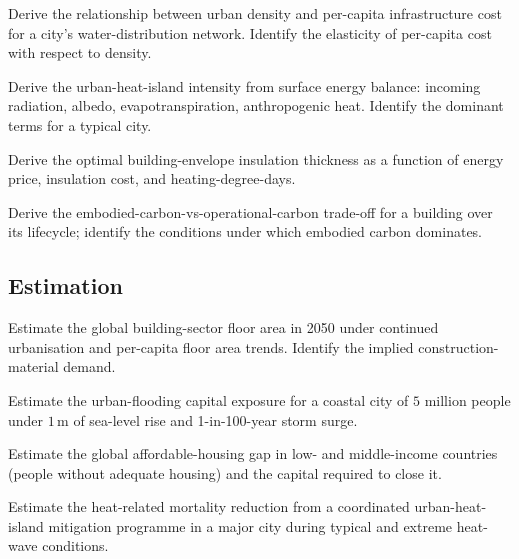 \begin{exercise}
Derive the relationship between urban density and per-capita infrastructure cost for a city's water-distribution network. Identify the elasticity of per-capita cost with respect to density.
\end{exercise}

\begin{exercise}
Derive the urban-heat-island intensity from surface energy balance: incoming radiation, albedo, evapotranspiration, anthropogenic heat. Identify the dominant terms for a typical city.
\end{exercise}

\begin{exercise}
Derive the optimal building-envelope insulation thickness as a function of energy price, insulation cost, and heating-degree-days.
\end{exercise}

\begin{exercise}
Derive the embodied-carbon-vs-operational-carbon trade-off for a building over its lifecycle; identify the conditions under which embodied carbon dominates.
\end{exercise}

\subsection*{Estimation}

\begin{exercise}
Estimate the global building-sector floor area in 2050 under continued urbanisation and per-capita floor area trends. Identify the implied construction-material demand.
\end{exercise}

\begin{exercise}
Estimate the urban-flooding capital exposure for a coastal city of $5$ million people under $1\,\text{m}$ of sea-level rise and 1-in-100-year storm surge.
\end{exercise}

\begin{exercise}
Estimate the global affordable-housing gap in low- and middle-income countries (people without adequate housing) and the capital required to close it.
\end{exercise}

\begin{exercise}
Estimate the heat-related mortality reduction from a coordinated urban-heat-island mitigation programme in a major city during typical and extreme heat-wave conditions.
\end{exercise}


